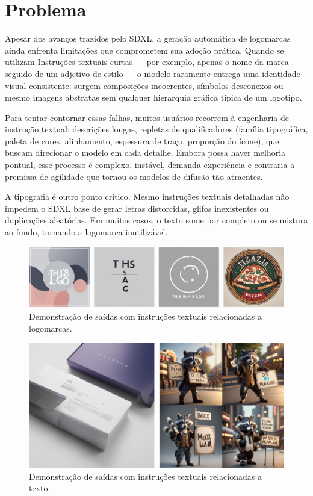 \documentclass[12pt, %
openright, 
oneside, %
a4paper,    %
brazil]{facom-ufu-abntex2}
\begin{document}
\section{Problema}

Apesar dos avanços trazidos pelo SDXL, a geração automática de logomarcas ainda enfrenta limitações que comprometem sua adoção prática. Quando se utilizam Instruções textuais curtas — por exemplo, apenas o nome da marca seguido de um adjetivo de estilo — o modelo raramente entrega uma identidade visual consistente: surgem composições incoerentes, símbolos desconexos ou mesmo imagens abstratas sem qualquer hierarquia gráfica típica de um logotipo.

Para tentar contornar essas falhas, muitos usuários recorrem à engenharia de instrução textual: descrições longas, repletas de qualificadores (família tipográfica, paleta de cores, alinhamento, espessura de traço, proporção do ícone), que buscam direcionar o modelo em cada detalhe. Embora possa haver melhoria pontual, esse processo é complexo, instável, demanda experiência e contraria a premissa de agilidade que tornou os modelos de difusão tão atraentes.

A tipografia é outro ponto crítico. Mesmo instruções textuais detalhadas não impedem o SDXL base de gerar letras distorcidas, glifos inexistentes ou duplicações aleatórias. Em muitos casos, o texto some por completo ou se mistura ao fundo, tornando a logomarca inutilizável.

\begin{figure}[H]
    \centering
	\includegraphics[width=\linewidth]{figuras/problem-1.png}
	\caption{Demonstração de saídas com instruções textuais relacionadas a logomarcas.}
	\label{fig:problem1}
\end{figure}

\begin{figure}[H]
    \centering
	\includegraphics[width=0.8\linewidth]{figuras/problem-3.png}
	\caption{Demonstração de saídas com instruções textuais relacionadas a texto.}
	\label{fig:problem2}
\end{figure}
\end{document}
